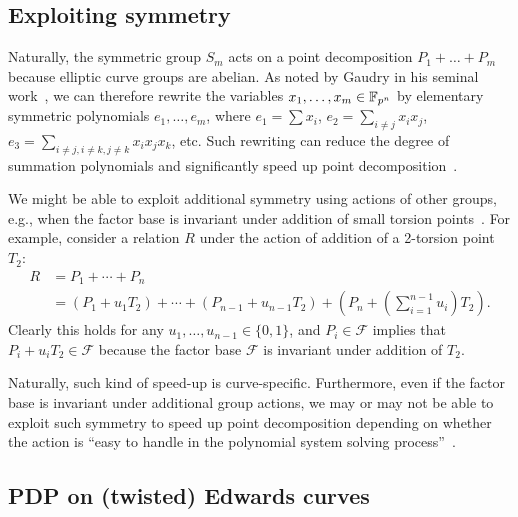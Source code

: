 \subsection{Exploiting symmetry}
%
\label{sec:exploit-symmetry}
%
Naturally, the symmetric group $S_m$ acts on a point decomposition
$P_1+\ldots+P_m$ because elliptic curve groups are abelian.
%
As noted by Gaudry in his seminal
work~\cite{DBLP:journals/jsc/Gaudry09}, we can therefore rewrite the
variables $x_1,\ldots,x_m\in\mathbb F_{p^n}$ by elementary symmetric
polynomials $e_1,\ldots,e_m$, where $e_1=\sum x_i$,
$e_2=\sum_{i\neq j}x_ix_j$,
$e_3=\sum_{i\neq j,i\neq k,j\neq k}x_ix_jx_k$, etc.
%
Such rewriting can reduce the degree of summation polynomials and
significantly speed up point
decomposition~\cite{DBLP:conf/eurocrypt/FaugerePPR12,DBLP:conf/iwsec/HuangPST13}.

We might be able to exploit additional symmetry using actions of other
groups, e.g., when the factor base is invariant under addition of
small torsion points~\cite{DBLP:journals/joc/FaugereGHR14}.
%
For example, consider a relation $R$ under the action of addition of a
2-torsion point $T_2$:
\begin{align*}
  R & = P_1+\cdots+P_n \\
    & =
      (P_1+u_1T_2)+\cdots+(P_{n-1}+u_{n-1}T_2)+\left(P_n+\left(\sum_{i=1}^{n-1}u_i\right)T_2\right).
\end{align*}
%
Clearly this holds for any $u_1,\ldots,u_{n-1}\in\{0,1\}$, and
$P_i\in\mathcal F$ implies that $P_i+u_iT_2\in\mathcal F$ because the
factor base $\mathcal F$ is invariant under addition of $T_2$.

Naturally, such kind of speed-up is curve-specific.
%
Furthermore, even if the factor base is invariant under additional
group actions, we may or may not be able to exploit such symmetry to
speed up point decomposition depending on whether the action is ``easy
to handle in the polynomial system solving
process''~\cite{DBLP:journals/joc/FaugereGHR14}.


\subsection{PDP on (twisted) Edwards curves}
\label{sec:twisted-edwards}


